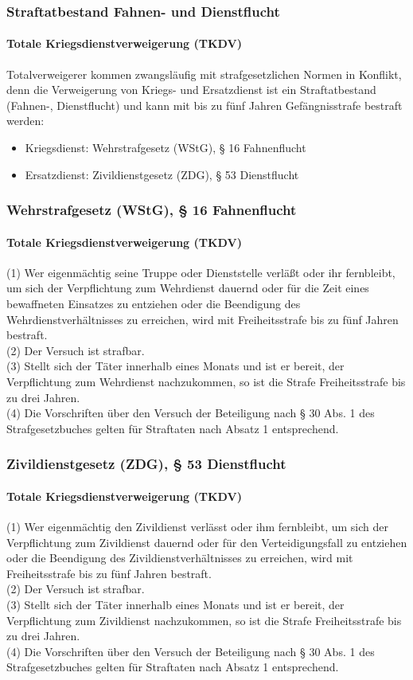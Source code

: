 \documentclass{beamer}
\begin{document}
	\begin{frame}
	  	\frametitle{Straftatbestand Fahnen- und Dienstflucht}
	  	\framesubtitle{Totale Kriegsdienstverweigerung (TKDV)}

	  	Totalverweigerer kommen zwangsläufig mit strafgesetzlichen Normen in Konflikt, denn die Verweigerung von Kriegs- und Ersatzdienst ist ein Straftatbestand (Fahnen-, Dienstflucht) und kann mit bis zu fünf Jahren Gefängnisstrafe bestraft werden:
	  	
	  	\begin{itemize}
	  		\item Kriegsdienst:  Wehrstrafgesetz (WStG), § 16 Fahnenflucht
	  		\item Ersatzdienst: Zivildienstgesetz (ZDG), § 53 Dienstflucht	  		
	  	\end{itemize}
	\end{frame}
		
	\begin{frame}
	  	\frametitle{Wehrstrafgesetz (WStG), § 16 Fahnenflucht}
	  	\framesubtitle{Totale Kriegsdienstverweigerung (TKDV)}
	  	(1) Wer eigenmächtig seine Truppe oder Dienststelle verläßt oder ihr fernbleibt, um sich der Verpflichtung zum Wehrdienst dauernd oder für die Zeit eines bewaffneten Einsatzes zu entziehen oder die Beendigung des Wehrdienstverhältnisses zu erreichen, wird mit Freiheitsstrafe bis zu fünf Jahren bestraft.\\
	  	(2) Der Versuch ist strafbar.\\
	  	(3) Stellt sich der Täter innerhalb eines Monats und ist er bereit, der Verpflichtung zum Wehrdienst nachzukommen, so ist die Strafe Freiheitsstrafe bis zu drei Jahren.\\
	  	(4) Die Vorschriften über den Versuch der Beteiligung nach § 30 Abs. 1 des Strafgesetzbuches gelten für Straftaten nach Absatz 1 entsprechend.
	\end{frame}
	
	\begin{frame}
	  	\frametitle{Zivildienstgesetz (ZDG), § 53 Dienstflucht}
	  	\framesubtitle{Totale Kriegsdienstverweigerung (TKDV)}
	  	(1) Wer eigenmächtig den Zivildienst verlässt oder ihm fernbleibt, um sich der Verpflichtung zum Zivildienst dauernd oder für den Verteidigungsfall zu entziehen oder die Beendigung des Zivildienstverhältnisses zu erreichen, wird mit Freiheitsstrafe bis zu fünf Jahren bestraft.\\
	  	(2) Der Versuch ist strafbar.\\
	  	(3) Stellt sich der Täter innerhalb eines Monats und ist er bereit, der Verpflichtung zum Zivildienst nachzukommen, so ist die Strafe Freiheitsstrafe bis zu drei Jahren.\\
	  	(4) Die Vorschriften über den Versuch der Beteiligung nach § 30 Abs. 1 des Strafgesetzbuches gelten für Straftaten nach Absatz 1 entsprechend.
	\end{frame}
	
\end{document}
